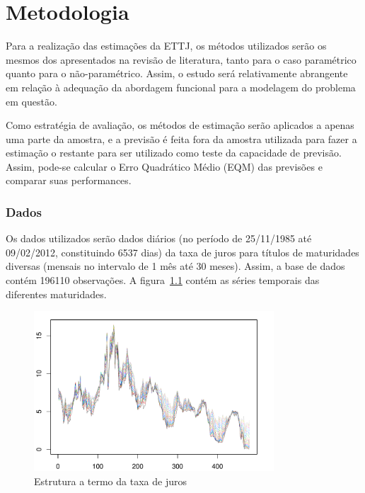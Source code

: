 \documentclass[
	12pt,				%
	openright,			%
	oneside,			%
	a4paper,			%
	english,			%
	brazil				%
	]{dissertacao-ufrgs-abntex2}
\begin{document}

\chapter{Metodologia} \label{ch:metodologia}

Para a realização das estimações da ETTJ, os métodos utilizados serão os mesmos dos apresentados na revisão de literatura, tanto para o caso paramétrico quanto para o não-paramétrico. Assim, o estudo será relativamente abrangente em relação à adequação da abordagem funcional para a modelagem do problema em questão.

Como estratégia de avaliação, os métodos de estimação serão aplicados a apenas uma parte da amostra, e a previsão é feita fora da amostra utilizada para fazer a estimação o restante para ser utilizado como teste da capacidade de previsão. Assim, pode-se calcular o Erro Quadrático Médio (EQM) das previsões e comparar suas performances. 

\subsection*{Dados}

Os dados utilizados serão dados diários (no período de 25/11/1985 até 09/02/2012, constituindo 6537 dias) da taxa de juros para títulos de maturidades diversas (mensais no intervalo de 1 mês até 30 meses). Assim, a base de dados contém 196110 observações. A figura~\ref{fig-est-termo} contém as séries temporais das diferentes maturidades.
\begin{figure}[h!] \label{fig-est-termo}
  \centering
    \includegraphics[width=0.8\textwidth]{anexos/taxas_juro}
  \caption{Estrutura a termo da taxa de juros}
\end{figure}
\end{document}
